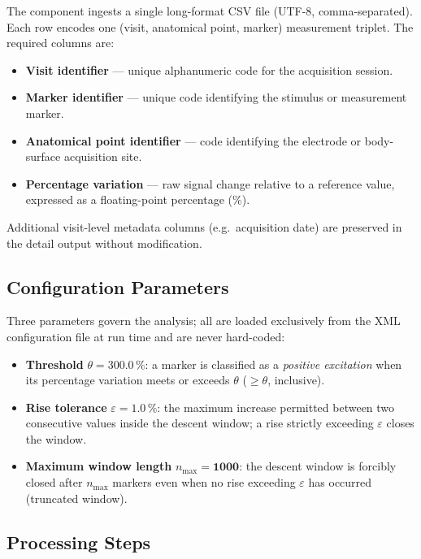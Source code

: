 \documentclass[a4paper,11pt]{article}
\begin{document}
The component ingests a single long-format CSV file (UTF-8, comma-separated). Each row
encodes one (visit, anatomical point, marker) measurement triplet. The required columns are:

\begin{itemize}
  \item \textbf{Visit identifier} --- unique alphanumeric code for the acquisition session.
  \item \textbf{Marker identifier} --- unique code identifying the stimulus or measurement
        marker.
  \item \textbf{Anatomical point identifier} --- code identifying the electrode or
        body-surface acquisition site.
  \item \textbf{Percentage variation} --- raw signal change relative to a reference value,
        expressed as a floating-point percentage (\%).
\end{itemize}

Additional visit-level metadata columns (e.g.\ acquisition date) are preserved in the
detail output without modification.

\subsection{Configuration Parameters}

Three parameters govern the analysis; all are loaded exclusively from the XML configuration
file at run time and are never hard-coded:

\begin{itemize}
  \item \textbf{Threshold} $\theta = \mathbf{300.0}\,\%$: a marker is
        classified as a \emph{positive excitation} when its percentage variation meets or
        exceeds $\theta$ ($\geq \theta$, inclusive).
  \item \textbf{Rise tolerance} $\varepsilon = \mathbf{1.0}\,\%$: the maximum
        increase permitted between two consecutive values inside the descent window; a rise
        strictly exceeding $\varepsilon$ closes the window.
  \item \textbf{Maximum window length} $n_{\max} = \mathbf{1000}$: the descent window
        is forcibly closed after $n_{\max}$ markers even when no rise exceeding $\varepsilon$
        has occurred (truncated window).
\end{itemize}

\subsection{Processing Steps}
\end{document}
